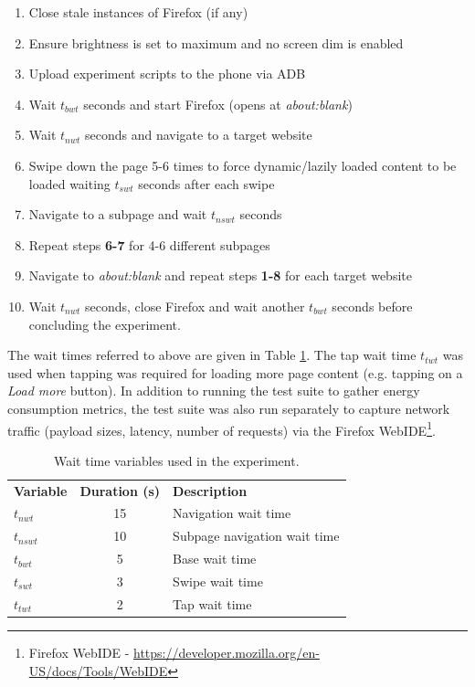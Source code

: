 \documentclass{article}
\begin{document}
\begin{enumerate}
    \item Close stale instances of Firefox (if any)
    \item Ensure brightness is set to maximum and no screen dim is enabled
    \item Upload experiment scripts to the phone via ADB
    \item Wait $t_{bwt}$ seconds and start Firefox (opens at \emph{about:blank})
    \item Wait $t_{nwt}$ seconds and navigate to a target website
    \item Swipe down the page 5-6 times to force dynamic/lazily loaded content to be loaded waiting $t_{swt}$ seconds after each swipe
    \item Navigate to a subpage and wait $t_{nswt}$ seconds
    \item Repeat steps \textbf{6-7} for 4-6 different subpages
    \item Navigate to \emph{about:blank} and repeat steps \textbf{1-8} for each target website
    \item Wait $t_{nwt}$ seconds, close Firefox and wait another $t_{bwt}$ seconds before concluding the experiment.
\end{enumerate}

The wait times referred to above are given in Table \ref{table:wait_times}. The tap wait time $t_{twt}$ was used when tapping was required for loading more page content (e.g. tapping on a \emph{Load more} button). In addition to running the test suite to gather energy consumption metrics, the test suite was also run separately to capture network traffic (payload sizes, latency, number of requests) via the Firefox WebIDE\footnote{Firefox WebIDE - \url{https://developer.mozilla.org/en-US/docs/Tools/WebIDE}}.

\begin{table}[h!]
    \centering
    \caption{Wait time variables used in the experiment.}
    \label{table:wait_times}
    \begin{tabular}{l|c|l}
        \textbf{Variable} & \textbf{Duration (s)} & \textbf{Description} \\
        $t_{nwt}$   & 15    & Navigation wait time \\
        $t_{nswt}$  & 10    & Subpage navigation wait time \\
        $t_{bwt}$   & 5     & Base wait time \\
        $t_{swt}$   & 3     & Swipe wait time \\
        $t_{twt}$   & 2     & Tap wait time
    \end{tabular}
\end{table}
\end{document}
